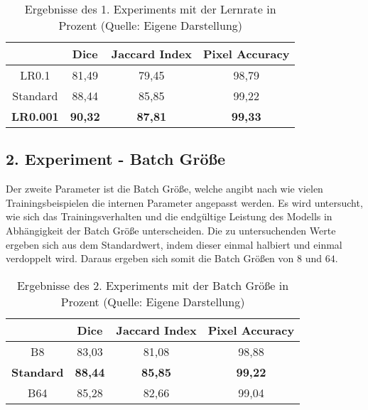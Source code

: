 \begin{table}[!h]
	\centering
	\begin{tabular}{|c|c|c|c|}
		\hline
		& Dice & Jaccard Index & Pixel Accuracy \\
		\hline
		LR0.1	& 81,49 			& 79,45 			& 98,79 \\
		\hline
		Standard& 88,44 			& 85,85 			& 99,22  \\
		\hline
		\textbf{LR0.001}	& \textbf{90,32} 	&  \textbf{87,81}	& \textbf{99,33} \\
		\hline
	\end{tabular}
	\caption{Ergebnisse des 1. Experiments mit der Lernrate in Prozent (Quelle: Eigene Darstellung)}
\end{table}

\subsection{2. Experiment - Batch Größe}
Der zweite Parameter ist die Batch Größe, welche angibt nach wie vielen Trainingsbeispielen die internen Parameter angepasst werden. Es wird untersucht, wie sich das Trainingsverhalten und die endgültige Leistung des \gls{Modell}s in Abhängigkeit der Batch Größe unterscheiden. Die zu untersuchenden Werte ergeben sich aus dem Standardwert, indem dieser einmal halbiert und einmal verdoppelt wird. Daraus ergeben sich somit die Batch Größen von $8$ und $64$.

\begin{table}[!h]
	\centering
	\begin{tabular}{|c|c|c|c|}
		\hline
		& Dice & Jaccard Index & Pixel Accuracy \\
		\hline
		B8					& 83,03 			&81,08  			& 98,88 \\
		\hline
		\textbf{Standard}	& \textbf{88,44} 	& \textbf{85,85}  	& \textbf{99,22}  \\
		\hline
		B64					& 85,28  			& 82,66 			& 99,04 \\
		\hline
	\end{tabular}
	\caption{Ergebnisse des 2. Experiments mit der Batch Größe in Prozent (Quelle: Eigene Darstellung)}
\end{table}

